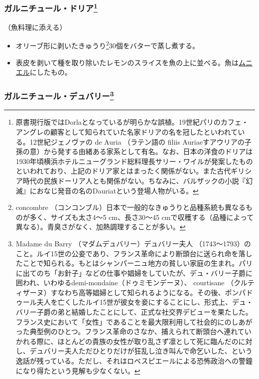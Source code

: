 \begin{recette}
\atoaki{}

\hypertarget{garniture-doria}{%
\subsubsection[ガルニチュール・ドリア]{\texorpdfstring{ガルニチュール・ドリア\footnote{原書現行版ではDorlaとなっているが明らかな誤植。19世紀パリのカフェ・アングレの顧客として知られていた名家ドリアの名を冠したといわれている。12世紀ジェノヴァの
  de Auria （ラテン語の filiis
  Auriaeすアウリアの子孫の意）から発する由緒ある家系として有名。なお、日本の洋食のドリアは1930年頃横浜ホテルニューグランド総料理長サリー・ワイルが発案したものといわれており、上記のドリア家とはまったく関係がない。また古代ギリシア時代の民族ドーリア人とも関係がない。ちなみに、バルザックの小説『幻滅』におなじ発音の名のDauriatという登場人物がいる。}}{ガルニチュール・ドリア}}\label{garniture-doria}}



（魚料理に添える）

\begin{itemize}
\item
  オリーブ形に剥いたきゅうり\footnote{concombre
    （コンコンブル）日本で一般的なきゅうりと品種系統も異なるものが多く、サイズも太さ4〜5
    cm、長さ30〜45
    cmで収穫する（品種によって異なる）。青臭さがなく、加熱調理することが多い。}30個をバターで蒸し煮する。
\item
  表皮を剥いて種を取り除いたレモンのスライスを魚の上に並べる。魚は\protect\hyperlink{meuniere}{ムニエル}にしたもの。
\end{itemize}

\atoaki{}

\hypertarget{garniture-dubarry}{%
\subsubsection[ガルニチュール・デュバリー]{\texorpdfstring{ガルニチュール・デュバリー\footnote{Madame
  du Barry （マダムデュバリー）デュバリー夫人
  （1743〜1793）のこと。ルイ15世の公妾であり、フランス革命により断頭台に送られ命を落したことで知られる。もとはシャンパーニュ地方の貧しい家庭の生まれ。パリに出てのち「お針子」などの仕事や娼婦をしていたが、デュ・バリー子爵に囲われ、いわゆるdemi-mondaine（ドゥミモンデーヌ）、
  courtisane
  （クルティザーヌ）すなわち高等娼婦として知られるようになる。その後、ポンパドゥール夫人を亡くしたルイ15世が彼女を妾にすることにし、形式上、デュ・バリー子爵の弟と結婚したことにして、正式な社交界デビューを果たした。フランス史において「女性」であることを最大限利用して社会的にのしあがった典型例のひとつ。フランス革命のさなか、捕えられて断頭台へ連れていかれる際に、ほとんどの貴族の女性が取り乱さず凛として死に臨んだのに対し、デュバリー夫人ただひとりだけが狂乱し泣き叫んで命乞いした、という逸話が残っている。ただし、それはロベスピエールによる恐怖政治への警鐘になり得たという見解も少なくない。}}{ガルニチュール・デュバリー}}\label{garniture-dubarry}}


\end{recette}

